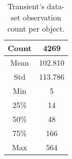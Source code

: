 \begin{table}
\centering
\begin{tabular}{c|c}
    \hline
    Count & 4269 \\
    \hline
    Mean & 102.810 \\
    Std & 113.786 \\
    Min & 5 \\
    25\% & 14 \\
    50\% & 48 \\
    75\% & 166 \\
    Max & 564 \\
    \hline
\end{tabular}
\caption{Transient's data-set observation count per object.}
\label{Transient-Observation-Count}
\end{table}